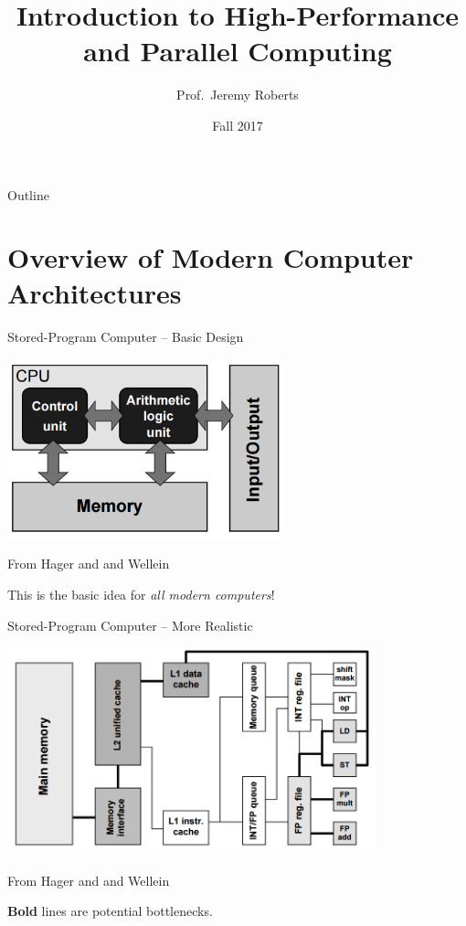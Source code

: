 \documentclass[10pt]{beamer}
\title %
[C++ and Fortran]{Introduction to High-Performance and Parallel Computing}
\author[Roberts]{Prof.~Jeremy Roberts}
\date
{Fall 2017}
\begin{document}
\begin{frame}[plain]
  \titlepage
\end{frame}

\begin{frame}{Outline}
  \tableofcontents
\end{frame}


\section{Overview of Modern Computer Architectures}

\begin{frame}{Stored-Program Computer -- Basic Design}

\includegraphics[width=0.6\textwidth]{stored_program_computer.png}

{\tiny From Hager and and Wellein}

\vfill

This is the basic idea for {\it all modern computers}!

\end{frame}


\begin{frame}{Stored-Program Computer -- More Realistic}

\includegraphics[width=0.8\textwidth]{cache_based_microprocessor.png}

{\tiny From Hager and and Wellein}
\vfill

{\bf Bold} lines are potential bottlenecks.

\end{frame}
\end{document}

